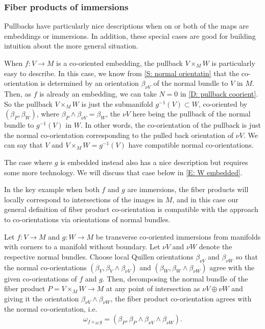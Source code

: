\subsubsection{Fiber products of immersions}\label{S: co-or product immersion}

Pullbacks have particularly nice descriptions when on or both of the maps are embeddings or immersions. In addition, these special cases are good for building intuition about the more general situation.


\begin{example}\label{E: V embedded}
When $f:V\to M$ is a co-oriented embedding, the pullback $V\times_MW$ is particularly easy to describe. In this case, we know from \cref{S: normal orientatin} that the co-orientation is determined by an orientation $\beta_{\nu V}$ of the normal bundle to $V$ in $M$. Then, as $f$ is already an embedding, we can take $N=0$ in \cref{D: pullback coorient}. So the pullback $V\times_MW$ is just the submanifold $g^{-1}(V)\subset W$, co-oriented by $(\beta_P,\beta_W)$, where $\beta_P\wedge \beta_{\nu V}=\beta_W$, the $\nu V$ here being the pullback of the normal bundle to $g^{-1}(V)$ in $W$. In other words, the co-orientation of the pullback is just the normal co-orientation corresponding to the pulled back orientation of $\nu V$. We can say that $V$ and $V\times_MW =g^{-1}(V)$ have compatible normal co-orientations.

The case where $g$ is embedded instead also has a nice description but requires some more technology. We will discuss that case below in \cref{E: W embedded}.
\end{example}






In the key example when both $f$ and $g$ are immersions, the fiber products will locally correspond to intersections of the images in $M$, and in this case our general definition of fiber product co-orientation is compatible with the approach to co-orientations via orientations of normal bundles.


\begin{proposition}\label{P: normal pullback}
Let $f : V \to M$ and $g: W \to M$ be transverse co-oriented immersions from manifolds with corners to a manifold without boundary. Let $\nu V$ and $\nu W$ denote the respective normal bundles.
Choose local Quillen orientations $\beta_{\nu V}$ and  $\beta_{\nu W}$ so that the normal co-orientations $(\beta_V,\beta_V\wedge \beta_{\nu V})$ and  $(\beta_W,\beta_W\wedge \beta_{\nu W})$ agree with the given co-orientations of $f$ and $g$.
Then, decomposing the normal bundle of the fiber product $P=V\times_M W\to M$ at any point of intersection as $\nu V \oplus \nu W$ and giving it the orientation $\beta_{\nu V}\wedge \beta_{\nu W}$, the fiber product co-orientation agrees with the normal co-orientation, i.e.\
$$\omega_{f\times_M g}=(\beta_P,\beta_P\wedge \beta_{\nu V}\wedge \beta_{\nu W}).$$
\end{proposition}

